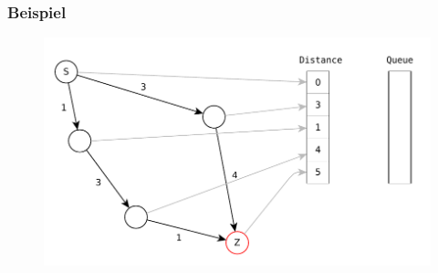 \begin{frame}
\frametitle{Beispiel}
\begin{figure}
\includegraphics[scale=.8]{dijkstra_graphs/dijkstra_B.pdf}
\end{figure}
\end{frame}
